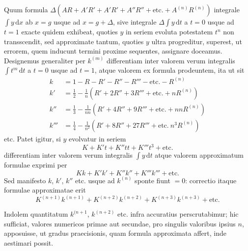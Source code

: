 
Quum formula $\Delta(AR+\allowbreak A'R'+\allowbreak A'R'+\allowbreak A''R''+\allowbreak \text{etc.}+\allowbreak A^{(n)}R^{(n)})$ integrale
$\int y\,\mathrm{d}x$ ab $x=g$ usque ad $x=g+\Delta$, sive integrale
$\Delta\int y\,\mathrm{d}t$ a $t=0$ usque ad $t=1$ exacte quidem exhibeat,
quoties $y$ in seriem evoluta potestatem $t^n$ non transscendit, sed approximate
tantum, quoties $y$ ultra progreditur, superest, ut errorem, quem inducunt
termini proxime sequentes, assignare doceamus. Designemus generaliter per
$k^{(m)}$ differentiam inter valorem verum integralis $\int t^m\,\mathrm{d}t$
a $t=0$ usque ad $t=1$, atque valorem ex formula prodeuntem, ita ut sit
\[
\begin{aligned}
k&=1-R-R'-R''-R'''-\text{etc.}-R^{(n)}\\
k'&=\frac12-\frac1n(R'+2R''+3R'''+\text{etc.}+nR^{(n)})\\
k''&=\frac13-\frac1{nn}(R'+4R''+9R'''+\text{etc.}+nnR^{(n)})\\
k'''&=\frac14-\frac1{n^2}(R'+8R''+27R'''+\text{etc.}\ n^3R^{(n)})
\end{aligned}
\]
etc. Patet igitur, si $y$ evolvatur in seriem
\[
K+K't+K''tt+K'''t^3+\text{etc.}
\]
differentiam inter valorem verum integralis $\int y\,\mathrm{d}t$ atque valorem
approximatum formulae exprimi per
\[
Kk+K'k'+K''k''+K'''k'''+\text{etc.}
\]
Sed manifesto $k$, $k'$, $k''$ etc. usque ad $k^{(n)}$ sponte fiunt $=0$:
correctio itaque formulae approximatae erit
\[
K^{(n+1)}k^{(n+1)}+K^{(n+2)}k^{(n+2)}+K^{(n+3)}k^{(n+3)}+\text{etc.}
\]

Indolem quantitatum $k^{(n+1}$, $k^{(n+2)}$ etc. infra accuratius
perscrutabimur; hic sufficiat, valores numericos primae aut secundae, pro
singulis valoribus ipsius $n$, apposuisse, ut gradus praecisionis, quam formula
approximata affert, inde aestimari possit.
